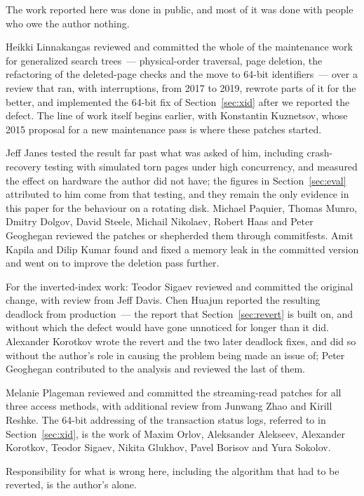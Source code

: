 \documentclass[11pt, a4paper]{article}
\begin{document}

The work reported here was done in public, and most of it was done with people
who owe the author nothing.

Heikki Linnakangas reviewed and committed the whole of the maintenance work for
generalized search trees~--- physical-order traversal, page deletion, the
refactoring of the deleted-page checks and the move to 64-bit identifiers~---
over a review that ran, with interruptions, from 2017 to 2019, rewrote parts of
it for the better, and implemented the 64-bit fix of Section~\ref{sec:xid} after
we reported the defect. The line of work itself begins earlier, with
Konstantin Kuznetsov, whose 2015 proposal for a new maintenance pass is where
these patches started.

Jeff Janes tested the result far past what was asked of him, including
crash-recovery testing with simulated torn pages under high concurrency, and
measured the effect on hardware the author did not have; the figures in
Section~\ref{sec:eval} attributed to him come from that testing, and they remain
the only evidence in this paper for the behaviour on a rotating disk. Michael
Paquier, Thomas Munro, Dmitry Dolgov, David Steele, Michail Nikolaev, Robert
Haas and Peter Geoghegan reviewed the patches or shepherded them through
commitfests. Amit Kapila and Dilip Kumar found and fixed a memory leak in the
committed version and went on to improve the deletion pass further.

For the inverted-index work: Teodor Sigaev reviewed and committed the original
change, with review from Jeff Davis. Chen Huajun reported the resulting deadlock
from production~--- the report that Section~\ref{sec:revert} is built on, and
without which the defect would have gone unnoticed for longer than it did.
Alexander Korotkov wrote the revert and the two later deadlock fixes, and did so
without the author's role in causing the problem being made an issue of; Peter
Geoghegan contributed to the analysis and reviewed the last of them.

Melanie Plageman reviewed and committed the streaming-read patches for all three
access methods, with additional review from Junwang Zhao and Kirill Reshke. The
64-bit addressing of the transaction status logs, referred to in
Section~\ref{sec:xid}, is the work of Maxim Orlov, Aleksander Alekseev,
Alexander Korotkov, Teodor Sigaev, Nikita Glukhov, Pavel Borisov and Yura
Sokolov.

Responsibility for what is wrong here, including the algorithm that had to be
reverted, is the author's alone.



\end{document}
